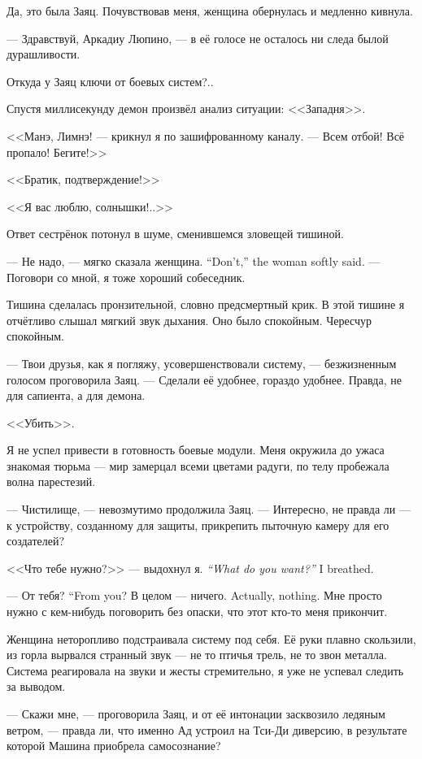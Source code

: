 \textspace

Да, это была Заяц.
Почувствовав меня, женщина обернулась и медленно кивнула.

--- Здравствуй, Аркадиу Люпино, --- в её голосе не осталось ни следа былой дурашливости.

Откуда у Заяц ключи от боевых систем?..

Спустя миллисекунду демон произвёл анализ ситуации: <<Западня>>.

<<Манэ, Лимнэ! --- крикнул я по зашифрованному каналу.
--- Всем отбой!
Всё пропало!
Бегите!>>

<<Братик, подтверждение!>>

<<Я вас люблю, солнышки!..>>

Ответ сестрёнок потонул в шуме, сменившемся зловещей тишиной.

{--- Не надо, --- мягко сказала женщина.}
{``Don't,'' the woman softly said.}
--- Поговори со мной, я тоже хороший собеседник.

Тишина сделалась пронзительной, словно предсмертный крик.
В этой тишине я отчётливо слышал мягкий звук дыхания.
Оно было спокойным.
Чересчур спокойным.

--- Твои друзья, как я погляжу, усовершенствовали систему, --- безжизненным голосом проговорила Заяц.
--- Сделали её удобнее, гораздо удобнее.
Правда, не для сапиента, а для демона.

<<Убить>>.

Я не успел привести в готовность боевые модули.
Меня окружила до ужаса знакомая тюрьма --- мир замерцал всеми цветами радуги, по телу пробежала волна парестезий.

--- Чистилище, --- невозмутимо продолжила Заяц.
--- Интересно, не правда ли --- к устройству, созданному для защиты, прикрепить пыточную камеру для его создателей?

{<<Что тебе нужно?>> --- выдохнул я.}
{\textit{``What do you want?''} I breathed.}

{--- От тебя?}
{``From you?}
{В целом --- ничего.}
{Actually, nothing.}
Мне просто нужно с кем-нибудь поговорить без опаски, что этот кто-то меня прикончит.

Женщина неторопливо подстраивала систему под себя.
Её руки плавно скользили, из горла вырвался странный звук --- не то птичья трель, не то звон металла.
Система реагировала на звуки и жесты стремительно, я уже не успевал следить за выводом.

--- Скажи мне, --- проговорила Заяц, и от её интонации засквозило ледяным ветром, --- правда ли, что именно Ад устроил на Тси-Ди диверсию, в результате которой Машина приобрела самосознание?

